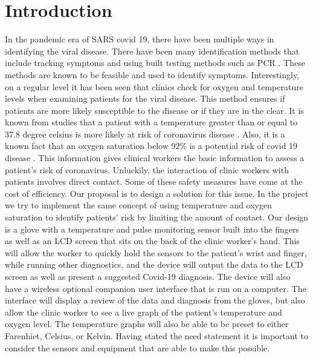 \documentclass[10pt, conference]{IEEEtran}
\begin{document}
\section{Introduction}
In the pandemic era of SARS covid 19, there have been multiple ways in identifying  the viral disease. There have been many identification methods that include tracking symptoms and using built testing methods such as PCR \cite{smyrlaki2020massive}. These methods are known to be feasible and used to identify symptoms. Interestingly, on a regular  level it has been seen that clinics check for oxygen and temperature levels when examining patients for the viral disease. This method ensures if patients are more likely susceptible to the disease or if they are in the clear. It is known from studies that a patient with a temperature greater than or equal to 37.8 degree celsius is more likely at risk of coronavirus disease \cite{jang2020prognostic}. Also, it is a known fact that an oxygen saturation below 92\% is a potential risk of covid 19 disease \cite{jang2020prognostic}. This information gives clinical workers the basic information to assess a patient's risk of coronavirus. Unluckily, the interaction of clinic workers with patients involves direct contact. Some of these safety measures have come at the cost of efficiency. Our proposal is to design a solution for this issue. In the project we try to implement the same concept of using temperature and oxygen saturation to identify patients' risk by limiting the amount of contact. Our design is a glove with a temperature and pulse monitoring sensor built into the fingers as well as an LCD screen that sits on the back of the clinic worker’s hand. This will allow the worker to quickly hold the sensors to the patient’s wrist and finger, while running other diagnostics, and the device will output the data to the LCD screen as well as present a suggested Covid-19 diagnosis. The device will also have a wireless optional companion user interface that is run on a computer. The interface will display a review of the data and diagnosis from the gloves, but also allow the clinic worker to see a live graph of the patient’s temperature and oxygen level. The temperature graphs will also be able to be preset to either Farenhiet, Celsius, or Kelvin. Having stated the need statement it is important to consider the sensors and equipment that are able to make this possible. 
\end{document}
